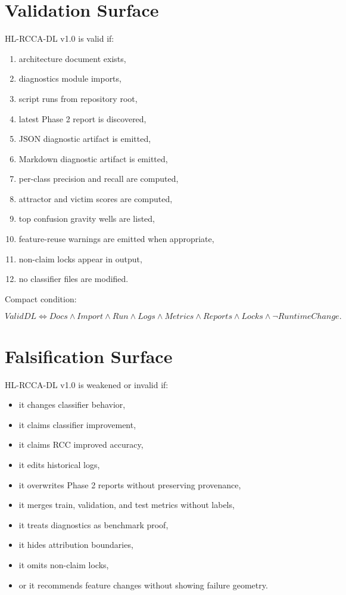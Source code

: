 \documentclass[12pt]{article}
\begin{document}
\section{Validation Surface}

HL-RCCA-DL v1.0 is valid if:

\begin{enumerate}
\item architecture document exists,
\item diagnostics module imports,
\item script runs from repository root,
\item latest Phase 2 report is discovered,
\item JSON diagnostic artifact is emitted,
\item Markdown diagnostic artifact is emitted,
\item per-class precision and recall are computed,
\item attractor and victim scores are computed,
\item top confusion gravity wells are listed,
\item feature-reuse warnings are emitted when appropriate,
\item non-claim locks appear in output,
\item no classifier files are modified.
\end{enumerate}

Compact condition:

\[
\boxed{
ValidDL
\Longleftrightarrow
Docs
\wedge
Import
\wedge
Run
\wedge
Logs
\wedge
Metrics
\wedge
Reports
\wedge
Locks
\wedge
\neg RuntimeChange.
}
\]

\section{Falsification Surface}

HL-RCCA-DL v1.0 is weakened or invalid if:

\begin{itemize}
\item it changes classifier behavior,
\item it claims classifier improvement,
\item it claims RCC improved accuracy,
\item it edits historical logs,
\item it overwrites Phase 2 reports without preserving provenance,
\item it merges train, validation, and test metrics without labels,
\item it treats diagnostics as benchmark proof,
\item it hides attribution boundaries,
\item it omits non-claim locks,
\item or it recommends feature changes without showing failure geometry.
\end{itemize}
\end{document}
